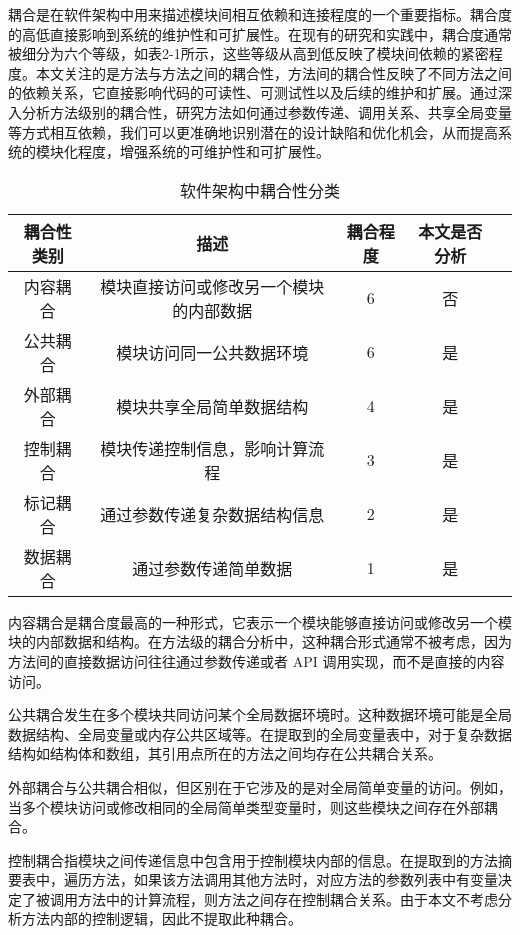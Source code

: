 耦合是在软件架构中用来描述模块间相互依赖和连接程度的一个重要指标。耦合度的高低直接影响到系统的维护性和可扩展性。在现有的研究和实践中，耦合度通常被细分为六个等级，如表2-1所示，这些等级从高到低反映了模块间依赖的紧密程度。本文关注的是方法与方法之间的耦合性，方法间的耦合性反映了不同方法之间的依赖关系，它直接影响代码的可读性、可测试性以及后续的维护和扩展。通过深入分析方法级别的耦合性，研究方法如何通过参数传递、调用关系、共享全局变量等方式相互依赖，我们可以更准确地识别潜在的设计缺陷和优化机会，从而提高系统的模块化程度，增强系统的可维护性和可扩展性。

\begin{table}[htbp]
\caption{软件架构中耦合性分类}
\vspace{0.5em}\centering\wuhao
\begin{tabular}{ccccc}
\toprule
耦合性类别 & 描述 & 耦合程度 & 本文是否分析 \\
\midrule
内容耦合 & 模块直接访问或修改另一个模块的内部数据 & 6 & 否\\
公共耦合 & 模块访问同一公共数据环境 & 6 & 是 \\
外部耦合 & 模块共享全局简单数据结构 & 4 & 是 \\
控制耦合 & 模块传递控制信息，影响计算流程 & 3 & 是 \\
标记耦合 & 通过参数传递复杂数据结构信息 & 2 & 是 \\
数据耦合 & 通过参数传递简单数据 & 1 & 是 \\
\bottomrule
\end{tabular}
\end{table}


内容耦合是耦合度最高的一种形式，它表示一个模块能够直接访问或修改另一个模块的内部数据和结构。在方法级的耦合分析中，这种耦合形式通常不被考虑，因为方法间的直接数据访问往往通过参数传递或者 API 调用实现，而不是直接的内容访问。

公共耦合发生在多个模块共同访问某个全局数据环境时。这种数据环境可能是全局数据结构、全局变量或内存公共区域等。在提取到的全局变量表中，对于复杂数据结构如结构体和数组，其引用点所在的方法之间均存在公共耦合关系。


外部耦合与公共耦合相似，但区别在于它涉及的是对全局简单变量的访问。例如，当多个模块访问或修改相同的全局简单类型变量时，则这些模块之间存在外部耦合。


控制耦合指模块之间传递信息中包含用于控制模块内部的信息。在提取到的方法摘
要表中，遍历方法，如果该方法调用其他方法时，对应方法的参数列表中有变量决定了被调用方法中的计算流程，则方法之间存在控制耦合关系。由于本文不考虑分析方法内部的控制逻辑，因此不提取此种耦合。


